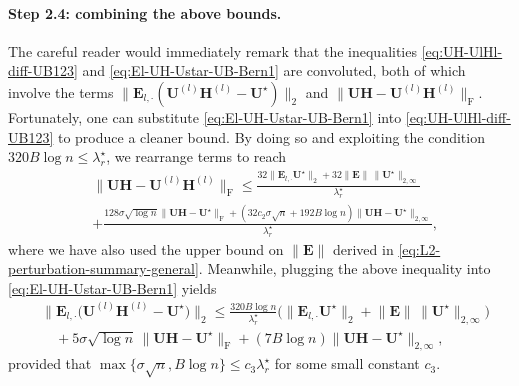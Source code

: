 

\paragraph{Step 2.4: combining the above bounds.}

The careful reader would immediately remark that the inequalities \eqref{eq:UH-UlHl-diff-UB123} and \eqref{eq:El-UH-Ustar-UB-Bern1} are convoluted, both of which  involve the terms  $\|\bm{E}_{l,\cdot} (\bm{U}^{(l)}\bm{H}^{(l)}-\bm{U}^{\star} ) \|_{2}$ and $\|\bm{U}\bm{H}-\bm{U}^{(l)}\bm{H}^{(l)}\|_{\mathrm{F}}$. Fortunately, one can substitute \eqref{eq:El-UH-Ustar-UB-Bern1} into \eqref{eq:UH-UlHl-diff-UB123} to produce a cleaner bound. By doing so and exploiting the condition $320B\log n \leq \lambda_r^{\star}$, we  rearrange terms to reach
%
\begin{align*}
	& \big\|\bm{U}\bm{H}-\bm{U}^{(l)}\bm{H}^{(l)}\big\|_{\mathrm{F}}
	\leq \frac{32\big\|\bm{E}_{l,\cdot}\bm{U}^{\star}\big\|_{2}+32\big\|\bm{E}\big\|\, \big\|\bm{U}^{\star}\big\|_{2,\infty}}{\lambda_{r}^{\star}}\nonumber \\
	& +\frac{128\sigma\sqrt{\log n}\big\|\bm{U}\bm{H}-\bm{U}^{\star}\big\|_{\mathrm{F}}+(32c_2\sigma \sqrt{n} +192B\log n)\big\|\bm{U}\bm{H}-\bm{U}^{\star}\big\|_{2,\infty}}{\lambda_{r}^{\star}},
\end{align*}
%
where we have also used the upper bound on $\|\bm{E}\|$ derived in \eqref{eq:L2-perturbation-summary-general}.
Meanwhile, plugging the above inequality into \eqref{eq:El-UH-Ustar-UB-Bern1} yields
%
\begin{align}
	& \big\|\bm{E}_{l,\cdot}\big(\bm{U}^{(l)}\bm{H}^{(l)}-\bm{U}^{\star}\big)\big\|_{2}
	\leq \frac{320B\log n}{\lambda_{r}^{\star}}\big(\big\|\bm{E}_{l,\cdot}\bm{U}^{\star}\big\|_{2}+\big\|\bm{E}\big\|\,\big\|\bm{U}^{\star}\big\|_{2,\infty}\big) \nonumber\\
	&\quad + 5\sigma\sqrt{\log n}\,\|\bm{U}\bm{H}-\bm{U}^{\star}\|_{\mathrm{F}}+(7B\log n)\|\bm{U}\bm{H}-\bm{U}^{\star}\|_{2,\infty}  ,
	\label{eq:El-UH-Ustar-UB-Bern123}
\end{align}
%
provided that $\max \{ \sigma \sqrt{n}, B\log n\} \leq c_3\lambda_r^{\star}$ for some  small constant $c_3$.



